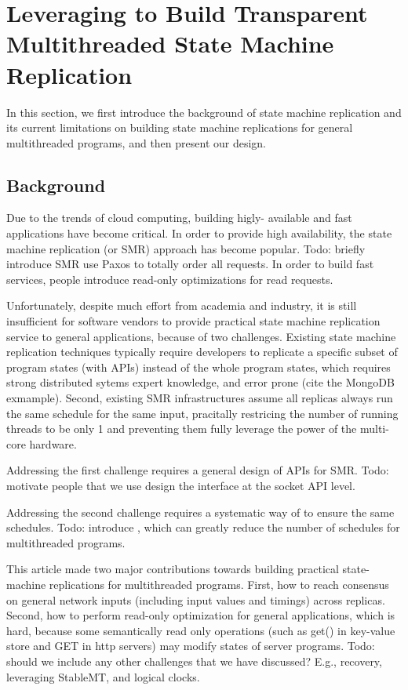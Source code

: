 \section{Leveraging \smt to Build Transparent Multithreaded State Machine Replication} \label{sec:replication}

In this section, we first introduce the background of state machine replication 
and its current limitations on building state machine replications for general 
multithreaded programs, and then present our design.

\subsection{Background} \label{sec:replication-intro}

Due to the trends of cloud computing, building higly-
available and fast applications have become critical. In order to 
provide high availability, the state machine replication (or SMR) approach has become 
popular. Todo: briefly introduce SMR use Paxos to totally order all requests. In order to
build fast services, people introduce read-only optimizations for read requests.

Unfortunately, despite much effort from academia and industry, it is still 
insufficient for software vendors to provide practical state machine 
replication service to general applications, because of two challenges. Existing 
state machine replication techniques typically require developers to replicate 
a specific subset of program states (with APIs) instead of the whole program 
states, which requires strong distributed sytems expert knowledge, and error prone 
(cite the MongoDB exmample). Second, existing SMR infrastructures assume all 
replicas always run the same schedule for the same input, pracitally restricing 
the number of running threads to be only 1 and preventing them fully leverage the 
power of the multi-core hardware.

Addressing the first challenge requires a general design of APIs for SMR. 
Todo: motivate people that we use design the interface at the socket API level.

Addressing the second challenge requires a systematic way of to ensure the same 
schedules. Todo: introduce \smt, which can greatly reduce the number of schedules for 
multithreaded programs.

This article made two major contributions towards building practical state-
machine replications for multithreaded programs. First, how to reach 
consensus on general network inputs (including input values and timings) 
across replicas. Second, how to perform read-only 
optimization for general applications, which is hard, because some 
semantically read only operations (such as get() in key-value store and GET 
in http servers) may modify states of server programs. Todo: should we 
include any other challenges that we have discussed? E.g., recovery, 
leveraging StableMT, and logical clocks.

